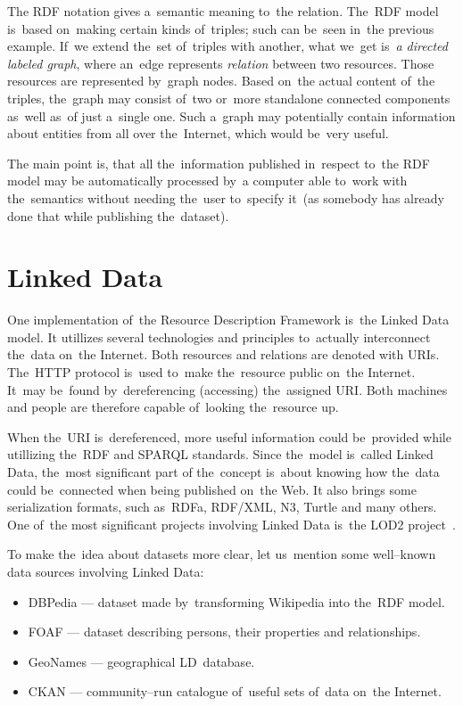 The RDF notation gives a~semantic meaning to~the relation. The~RDF model is~based on~making certain
kinds of~triples; such can be~seen in~the previous example. If~we extend the~set of~triples with another,
what we~get is~\emph{a directed labeled graph}, where an~edge represents \emph{relation} between two resources.
Those resources are represented by~graph nodes. Based on~the actual content of~the triples,
the~graph may consist of~two or~more standalone connected components as~well as~of
just a~single one. Such a~graph may potentially contain information about entities from all over
the~Internet, which would be~very useful.

The main point is, that all the~information published in~respect to~the RDF model may be
automatically processed by~a computer able to~work with the~semantics without
needing the~user to~specify it~(as somebody has already done that while publishing the~dataset).

\section{Linked Data}

One implementation of~the Resource Description Framework is~the Linked Data model.
It utillizes several technologies and principles to~actually interconnect the~data on~the Internet.
Both resources and relations are denoted with URIs. The~HTTP protocol is~used to~make
the~resource public on~the Internet. It~may be~found by~dereferencing (accessing) the~assigned
URI. Both machines and people are therefore capable of~looking the~resource up.

When the~URI is~dereferenced, more useful information could be~provided while utillizing the~RDF
and SPARQL standards. Since the~model is~called Linked Data, the~most significant part
of the~concept is~about knowing how the~data could be~connected when being published on~the Web.
It also brings some serialization formats, such as~RDFa, RDF/XML, N3, Turtle and many others.
One of~the most significant projects involving Linked Data is~the LOD2 project~\cite{lod2}.

To make the~idea about datasets more clear, let us~mention some well--known data sources
involving Linked Data:

\begin{itemize}
\item DBPedia --- dataset made by~transforming Wikipedia into the~RDF model.
\item FOAF --- dataset describing persons, their properties and relationships.
\item GeoNames --- geographical LD~database.
\item CKAN --- community--run catalogue of~useful sets of~data on~the Internet.
\end{itemize}

